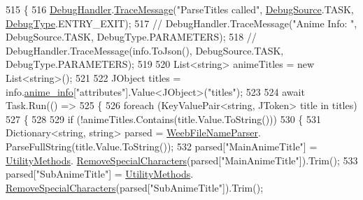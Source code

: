 \begin{DoxyCode}
515         \{
516             \mbox{\hyperlink{class_little_weeb_library_1_1_handlers_1_1_anime_profile_handler_a0b0ae3c3838d26351485e6dfc566a632}{DebugHandler}}.\mbox{\hyperlink{interface_little_weeb_library_1_1_handlers_1_1_i_debug_handler_a2e405bc3492e683cd3702fae125221bc}{TraceMessage}}(\textcolor{stringliteral}{"ParseTitles called"}, 
      \mbox{\hyperlink{namespace_little_weeb_library_1_1_handlers_a2a6ca0775121c9c503d58aa254d292be}{DebugSource}}.TASK, \mbox{\hyperlink{namespace_little_weeb_library_1_1_handlers_ab66019ed40462876ec4e61bb3ccb0a62}{DebugType}}.ENTRY\_EXIT);
517   \textcolor{comment}{//          DebugHandler.TraceMessage("Anime Info: ", DebugSource.TASK, DebugType.PARAMETERS);}
518 \textcolor{comment}{//            DebugHandler.TraceMessage(info.ToJson(), DebugSource.TASK, DebugType.PARAMETERS);}
519 
520             List<string> animeTitles = \textcolor{keyword}{new} List<string>();
521 
522             JObject titles = info.\mbox{\hyperlink{class_little_weeb_library_1_1_models_1_1_json_kitsu_anime_info_a1a83f1d3043428e596a7a62ab36e27db}{anime\_info}}[\textcolor{stringliteral}{"attributes"}].Value<JObject>(\textcolor{stringliteral}{"titles"});
523 
524             await Task.Run(() =>
525             \{
526                 \textcolor{keywordflow}{foreach} (KeyValuePair<string, JToken> title \textcolor{keywordflow}{in} titles)
527                 \{
528 
529                     \textcolor{keywordflow}{if} (!animeTitles.Contains(title.Value.ToString()))
530                     \{
531                         Dictionary<string, string> parsed = \mbox{\hyperlink{class_little_weeb_library_1_1_handlers_1_1_anime_profile_handler_a7f6515084315842dded98b57c4f7cd22}{WeebFileNameParser}}.
      ParseFullString(title.Value.ToString());
532                         parsed[\textcolor{stringliteral}{"MainAnimeTitle"}] = \mbox{\hyperlink{class_little_weeb_library_1_1_static_classes_1_1_utility_methods}{UtilityMethods}}.
      \mbox{\hyperlink{class_little_weeb_library_1_1_static_classes_1_1_utility_methods_aa04235b1cf84b6741c496d8ecaea0eeb}{RemoveSpecialCharacters}}(parsed[\textcolor{stringliteral}{"MainAnimeTitle"}]).Trim();
533                         parsed[\textcolor{stringliteral}{"SubAnimeTitle"}] = \mbox{\hyperlink{class_little_weeb_library_1_1_static_classes_1_1_utility_methods}{UtilityMethods}}.
      \mbox{\hyperlink{class_little_weeb_library_1_1_static_classes_1_1_utility_methods_aa04235b1cf84b6741c496d8ecaea0eeb}{RemoveSpecialCharacters}}(parsed[\textcolor{stringliteral}{"SubAnimeTitle"}]).Trim();

\end{DoxyCode}
